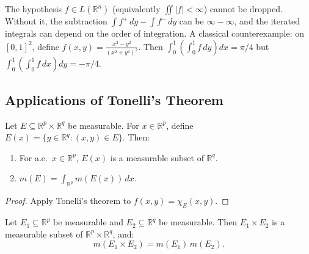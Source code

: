 \documentclass[11pt]{report}
\begin{document}
\begin{rembox}
The hypothesis $f \in L(\mathbb{R}^n)$ (equivalently $\iint |f| < \infty$) cannot be dropped. Without it, the subtraction $\int f^+\,dy - \int f^-\,dy$ can be $\infty - \infty$, and the iterated integrals can depend on the order of integration. A classical counterexample: on $[0,1]^2$, define $f(x,y) = \frac{x^2 - y^2}{(x^2 + y^2)^2}$. Then $\int_0^1\!\left(\int_0^1 f\,dy\right)dx = \pi/4$ but $\int_0^1\!\left(\int_0^1 f\,dx\right)dy = -\pi/4$.
\end{rembox}

\subsection{Applications of Tonelli's Theorem}

\begin{thmbox}
Let $E \subseteq \mathbb{R}^p \times \mathbb{R}^q$ be measurable. For $x \in \mathbb{R}^p$, define $E(x) = \{y \in \mathbb{R}^q : (x, y) \in E\}$. Then:
\begin{enumerate}[label=(\roman*)]
\item For a.e.\ $x \in \mathbb{R}^p$, $E(x)$ is a measurable subset of $\mathbb{R}^q$.
\item $m(E) = \int_{\mathbb{R}^p} m(E(x))\,dx$.
\end{enumerate}
\end{thmbox}

\begin{proof}
Apply Tonelli's theorem to $f(x, y) = \chi_E(x, y)$.
\end{proof}

\begin{thmbox}
Let $E_1 \subseteq \mathbb{R}^p$ be measurable and $E_2 \subseteq \mathbb{R}^q$ be measurable. Then $E_1 \times E_2$ is a measurable subset of $\mathbb{R}^p \times \mathbb{R}^q$, and:
\[
m(E_1 \times E_2) = m(E_1)\,m(E_2).
\]
\end{thmbox}
\end{document}
